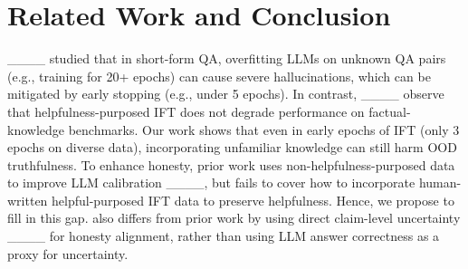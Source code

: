 \section{Related Work and Conclusion}
____ studied that in short-form QA, overfitting LLMs on unknown QA pairs (e.g., training for 20+ epochs) can cause severe hallucinations, which can be mitigated by early stopping (e.g., under 5 epochs). In contrast, ____ observe that helpfulness-purposed IFT does not degrade performance on factual-knowledge benchmarks. Our work shows that even in early epochs of IFT (only 3 epochs on diverse data), incorporating unfamiliar knowledge can still harm OOD truthfulness.
To enhance honesty, prior work uses non-helpfulness-purposed data to improve LLM calibration ____, but fails to cover how to incorporate human-written helpful-purposed IFT data to preserve helpfulness. Hence, we propose \algname\space to fill in this gap. \algname\space also differs from prior work by using direct claim-level uncertainty ____ for honesty alignment, rather than using LLM answer correctness as a proxy for uncertainty.